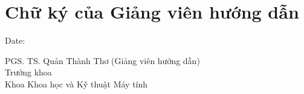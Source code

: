 \chapter*{Chữ ký của Giảng viên hướng dẫn}

\vspace{1cm}

\makebox[0.7\linewidth][l]{\hrulefill} Date: \makebox[0.2\linewidth][l]{\hrulefill}

    \begin{flushleft}
    PGS. TS. Quản Thành Thơ (Giảng viên hướng dẫn)\\
    Trưởng khoa \\
    Khoa Khoa học và Kỹ thuật Máy tính
    \end{flushleft}